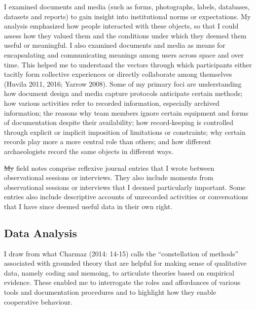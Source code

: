 \documentclass[
]{article}
\makeatletter
\providecommand{\DIFadd}[1]{{\protect\color{blue}\uwave{#1}}} %
\providecommand{\DIFdel}[1]{{\protect\color{red}\sout{#1}}} %
\providecommand{\DIFaddbegin}{} %
\providecommand{\DIFaddend}{} %
\providecommand{\DIFdelbegin}{} %
\providecommand{\DIFdelend}{} %
\newcommand{\DIFscaledelfig}{0.5}
\newlength{\DIFdelgraphicswidth} %
\newlength{\DIFdelgraphicsheight} %
\newcommand{\DIFaddincludegraphics}[2][]{{\color{blue}\fbox{\DIFOincludegraphics[#1]{#2}}}} %
\newcommand{\DIFdelincludegraphics}[2][]{%
\sbox{\DIFdelgraphicsbox}{\DIFOincludegraphics[#1]{#2}}%
\settoboxwidth{\DIFdelgraphicswidth}{\DIFdelgraphicsbox} %
\settoboxtotalheight{\DIFdelgraphicsheight}{\DIFdelgraphicsbox} %
\scalebox{\DIFscaledelfig}{%
\parbox[b]{\DIFdelgraphicswidth}{\usebox{\DIFdelgraphicsbox}\\[-\baselineskip] \rule{\DIFdelgraphicswidth}{0em}}\llap{\resizebox{\DIFdelgraphicswidth}{\DIFdelgraphicsheight}{%
\setlength{\unitlength}{\DIFdelgraphicswidth}%
\begin{picture}(1,1)%
\thicklines\linethickness{2pt} %
{\color[rgb]{1,0,0}\put(0,0){\framebox(1,1){}}}%
{\color[rgb]{1,0,0}\put(0,0){\line( 1,1){1}}}%
{\color[rgb]{1,0,0}\put(0,1){\line(1,-1){1}}}%
\end{picture}%
}\hspace*{3pt}}} %
} %
\DeclareRobustCommand{\DIFaddbegin}{\DIFOaddbegin \let\includegraphics\DIFaddincludegraphics} %
\DeclareRobustCommand{\DIFaddend}{\DIFOaddend \let\includegraphics\DIFOincludegraphics} %
\DeclareRobustCommand{\DIFdelbegin}{\DIFOdelbegin \let\includegraphics\DIFdelincludegraphics} %
\DeclareRobustCommand{\DIFdelend}{\DIFOaddend \let\includegraphics\DIFOincludegraphics} %
\let\sout@orig\sout %
\renewcommand{\sout}[1]{\ifmmode\text{\sout@orig{\ensuremath{#1}}}\else\sout@orig{#1}\fi} %
\makeatother
\begin{document}
I examined documents and media (such as forms, photographs, labels,
databases, datasets and reports) to gain insight into institutional
norms or expectations. My analysis emphasized how people interacted with
these objects, so that I could assess how they valued them and the
conditions under which they deemed them useful or meaningful. I also
examined documents and media as means for encapsulating and
communicating meanings among users across space and over time. This
helped me to understand the vectors through which participants either
tacitly form collective experiences or directly collaborate among
themselves (Huvila 2011, 2016; Yarrow 2008). Some of my primary foci are
understanding how document design and media capture protocols anticipate
certain methods; how various activities refer to recorded information,
especially archived information; the reasons why team members ignore
certain equipment and forms of documentation despite their availability;
how record-keeping is controlled through explicit or implicit imposition
of limitations or constraints; why certain records play more a more
central role than others; and how different archaeologists record the
same objects in different ways.

\DIFdelbegin \DIFdel{My }\DIFdelend \DIFaddbegin \DIFadd{Finally, my }\DIFaddend field notes comprise reflexive journal entries that I wrote
between observational sessions or interviews. They also include moments
from observational sessions or interviews that I deemed particularly
important. Some entries also include descriptive accounts of unrecorded
activities or conversations that I have since deemed useful data in
their own right.

\subsection{Data Analysis}\label{data-analysis}

I draw from what Charmaz (2014: 14-15) calls the ``constellation of
methods'' associated with grounded theory that are helpful for making
sense of qualitative data, namely coding and memoing, to articulate
theories based on empirical evidence. These enabled me to interrogate
the roles and affordances of various tools and documentation procedures
and to highlight how they enable cooperative behaviour.
\end{document}
